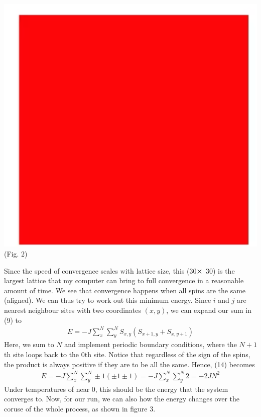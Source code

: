\documentclass{article}
\begin{document}
\begin{center}
    \includegraphics[scale=.1]{fullAlign.png}\\[-3.9pt] 
    (Fig. 2)
\end{center}
Since the speed of convergence scales with lattice size, this (30$\cross$ 30)
is the largest lattice that my computer can bring to full convergence in a 
reasonable amount of time. We see that convergence happens when all spins are the same (aligned).
We can thus try to work out this minimum energy. Since $i$ and $j$ are nearest neighbour sites with two coordinates $(x,y)$, 
we can expand our sum in (9) to 
\begin{align}
    E=-J\sum^N_x\sum^N_yS_{x,y}(S_{x+1,y}+S_{x,y+1})
\end{align}
Here, we sum to $N$ and implement periodic boundary conditions, where the $N+1$th site 
loops back to the 0th site. Notice that regardless of the sign of the spins, the product is always positive if 
they are to be all the same. Hence, (14) becomes 
\begin{align}
    E=-J\sum_x^N\sum_y^N\pm1(\pm1\pm1)=-J\sum_x^N\sum_y^N2=-2JN^2
\end{align}
Under temperatures of near 0, this should be the energy that 
the system converges to. Now, for our run, we can also how the energy changes over the coruse of the
whole process, as shown in figure 3.
\end{document}
